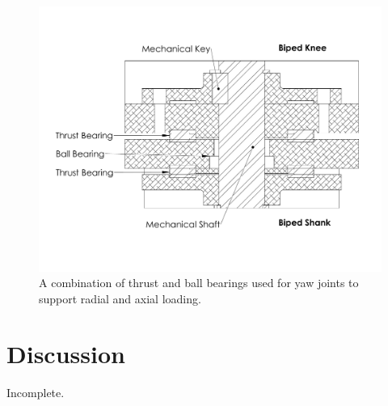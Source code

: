 \begin{figure}[!ht]
	\begin{center}
    \includegraphics[trim = 5mm 34mm 5mm 25mm,clip,width=15cm]{fig/design/yawbearing.pdf}
	\end{center}
  \caption{A combination of thrust and ball bearings used for yaw joints to support radial and axial loading.}
\label{fig:yawbearing}
\end{figure}



\section{Discussion} %
\label{sec:design_discussion}
Incomplete.

